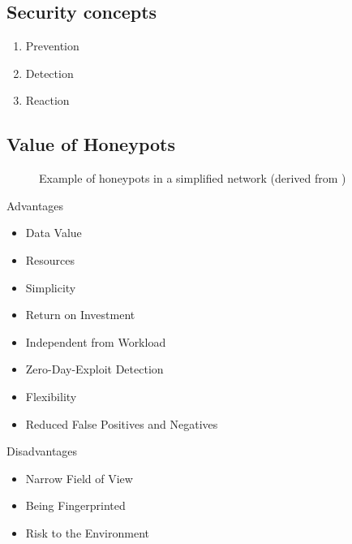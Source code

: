 \subsection{Security concepts}
\label{subsec:honeypot-security-concept}

\cite{Schneier2004}

\begin{enumerate}
    \item Prevention
    \item Detection
    \item Reaction
\end{enumerate}

\cite{NawrockiWSKS2016}

\subsection{Value of Honeypots}

\begin{figure}[h]
    \centering
    
    \caption{Example of honeypots in a simplified network (derived from \cite{Spitzner2003})}
    \label{fig:honeypot-example}
\end{figure}

Advantages

\begin{itemize}
    \item Data Value
    \item Resources
    \item Simplicity
    \item Return on Investment
\end{itemize}

\begin{itemize}
    \item Independent from Workload
    \item Zero-Day-Exploit Detection
    \item Flexibility
    \item Reduced False Positives and Negatives
\end{itemize}

Disadvantages

\begin{itemize}
    \item Narrow Field of View
    \item Being Fingerprinted
    \item Risk to the Environment
\end{itemize}

